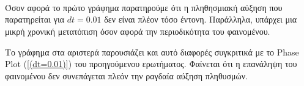 \documentclass{article}
\begin{document}
\noindent
\\
\\
\\
Όσον αφορά το πρώτο γράφημα παρατηρούμε ότι η πληθησμιακή αύξηση που παρατηρείται για $ dt = 0.01 $ δεν είναι πλέον τόσο έντονη. Παράλληλα,  υπάρχει μια μικρή χρονική μετατόπιση όσον αφορά την περιοδικότητα του φαινομένου.

\noindent
\newline
Το γράφημα στα αριστερά παρουσιάζει και αυτό διαφορές συγκριτικά με το \foreignlanguage{english}{Phase Plot} (\autoref{(dt=0.01)}) του προηγούμενου ερωτήματος. Φαίνεται ότι η επανάληψη του φαινομένου δεν συνεπάγεται πλεόν την ραγδαία αύξηση πληθυσμών. 
\end{document}
